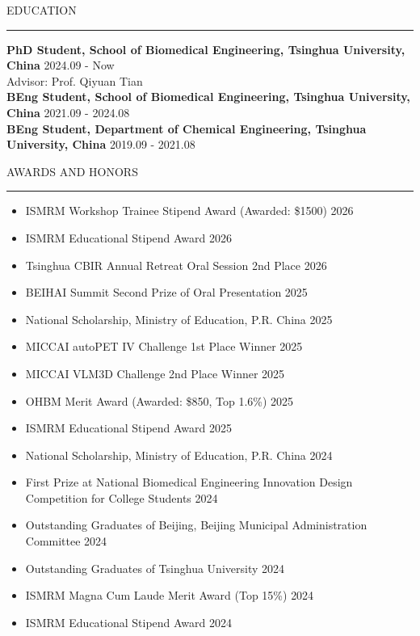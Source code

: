\documentclass{resume} %
\renewenvironment{rSection}[1]{
\sectionskip
\textcolor{TsinghuaPurple}{\MakeUppercase{#1}}
\sectionlineskip
\hrule
\begin{list}{}{
\setlength{\leftmargin}{0em}
}
\item[]
}{
\end{list}
}
\begin{document}
  

\begin{rSection}{Education}

{\bf PhD Student, School of Biomedical Engineering, Tsinghua University, China} \hfill {2024.09 - Now}
\\ 
    Advisor: Prof. Qiyuan Tian
\\
{\bf BEng Student, School of Biomedical Engineering, Tsinghua University, China} \hfill {2021.09 - 2024.08}
\\ 
{\bf BEng Student, Department of Chemical Engineering, Tsinghua University, China} \hfill {2019.09 - 2021.08}

\end{rSection}


\begin{rSection}{Awards and Honors}
\begin{itemize}
    \item ISMRM Workshop Trainee Stipend Award (Awarded: \$1500) \hfill{2026}
    \item ISMRM Educational Stipend Award \hfill{2026}
    \item Tsinghua CBIR Annual Retreat Oral Session 2nd Place \hfill{2026}
    \item BEIHAI Summit Second Prize of Oral Presentation \hfill{2025}
    \item National Scholarship, Ministry of Education, P.R. China \hfill{2025}
    \item MICCAI autoPET IV Challenge 1st Place Winner \hfill{2025}
    \item MICCAI VLM3D Challenge 2nd Place Winner \hfill{2025}
    \item OHBM Merit Award  (Awarded: \$850, Top 1.6\%) \hfill{2025}
    \item ISMRM Educational Stipend Award \hfill{2025}
    \item National Scholarship, Ministry of Education, P.R. China \hfill{2024}
    \item First Prize at National Biomedical Engineering Innovation Design Competition for College Students \hfill{2024}
    \item Outstanding Graduates of Beijing, Beijing Municipal Administration Committee \hfill{2024}
    \item Outstanding Graduates of Tsinghua University \hfill{2024}
    \item ISMRM Magna Cum Laude Merit Award (Top 15\%) \hfill{2024}
    \item ISMRM Educational Stipend Award \hfill{2024}

\end{itemize}
\end{rSection}
\end{document}
